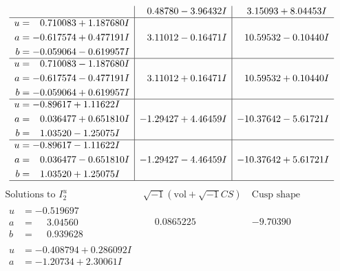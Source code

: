 \documentclass[1p]{elsarticle_modified}
\theoremstyle{definition}
\newcommand{\I}{\sqrt{-1}}
\begin{document}
$$\begin{array}{c|c|c}
 & \phantom{-}0.48780 - 3.96432 I & \phantom{-}3.15093 + 8.04453 I \\ \hline\begin{aligned}
u &= \phantom{-}0.710083 + 1.187680 I \\
a &= -0.617574 + 0.477191 I \\
b &= -0.059064 - 0.619957 I\end{aligned}
 & \phantom{-}3.11012 - 0.16471 I & \phantom{-}10.59532 - 0.10440 I \\ \hline\begin{aligned}
u &= \phantom{-}0.710083 - 1.187680 I \\
a &= -0.617574 - 0.477191 I \\
b &= -0.059064 + 0.619957 I\end{aligned}
 & \phantom{-}3.11012 + 0.16471 I & \phantom{-}10.59532 + 0.10440 I \\ \hline\begin{aligned}
u &= -0.89617 + 1.11622 I \\
a &= \phantom{-}0.036477 + 0.651810 I \\
b &= \phantom{-}1.03520 - 1.25075 I\end{aligned}
 & -1.29427 + 4.46459 I & -10.37642 - 5.61721 I \\ \hline\begin{aligned}
u &= -0.89617 - 1.11622 I \\
a &= \phantom{-}0.036477 - 0.651810 I \\
b &= \phantom{-}1.03520 + 1.25075 I\end{aligned}
 & -1.29427 - 4.46459 I & -10.37642 + 5.61721 I\\
 \hline 
 \end{array}$$\newpage$$\begin{array}{c|c|c}  
\text{Solutions to }I^u_{2}& \I (\text{vol} + \sqrt{-1}CS) & \text{Cusp shape}\\
 \hline 
\begin{aligned}
u &= -0.519697\phantom{ +0.000000I} \\
a &= \phantom{-}3.04560\phantom{ +0.000000I} \\
b &= \phantom{-}0.939628\phantom{ +0.000000I}\end{aligned}
 & \phantom{-}0.0865225\phantom{ +0.000000I} & -9.70390\phantom{ +0.000000I} \\ \hline\begin{aligned}
u &= -0.408794 + 0.286092 I \\
a &= -1.20734 + 2.30061 I \\

\end{aligned}
\end{array}$$
\end{document}
